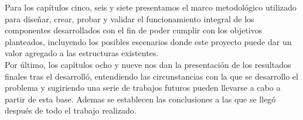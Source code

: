 Para los capítulos cinco, seis y siete presentamos el marco metodológico utilizado para diseñar, crear, probar y validar el funcionamiento integral de los componentes desarrollados con el fin de poder cumplir con los objetivos planteados, incluyendo los posibles escenarios donde este proyecto puede dar un valor agregado a las estructuras existentes.\\
 
Por último, los capítulos ocho y nueve nos dan la presentación de los resultados finales tras el desarrolló, entendiendo las circunstancias con la que se desarrollo el problema y sugiriendo una serie de trabajos futuros pueden llevarse a cabo a partir de esta base. Ademas se establecen las conclusiones a las que se llegó después de todo el trabajo realizado.

